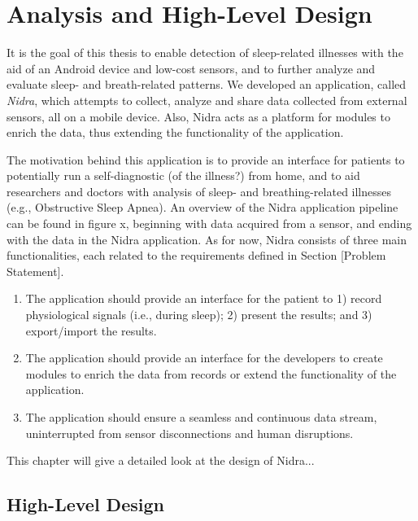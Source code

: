
\chapter{Analysis and High-Level Design}

It is the goal of this thesis to enable detection of sleep-related illnesses 
with the aid of an Android device and low-cost sensors, and to further analyze 
and evaluate sleep- and breath-related patterns. We developed an application, 
called \textit{Nidra}, which attempts to collect, analyze and share data collected 
from external sensors, all on a mobile device. Also, Nidra acts as a platform for 
modules to enrich the data, thus extending the functionality of the application.

The motivation behind this application is to provide an interface for patients 
to potentially run a self-diagnostic (of the illness?) from home, and to aid 
researchers and doctors with analysis of sleep- and breathing-related illnesses 
(e.g., Obstructive Sleep Apnea). An overview of the Nidra application pipeline 
can be found in figure x, beginning with data acquired from a sensor, and ending 
with the data in the Nidra application. As for now, Nidra consists of three 
main functionalities, each related to the requirements defined in Section [Problem Statement]. 

\begin{enumerate}
    \item The application should provide an interface for the patient to 1) record physiological signals (i.e., during sleep); 2) present the results; and 3) export/import the results.
    \item The application should provide an interface for the developers to create modules to enrich the data from records or extend the functionality of the application. 
    \item The application should ensure a seamless and continuous data stream, uninterrupted from sensor disconnections and human disruptions.
\end{enumerate}

This chapter will give a detailed look at the design of Nidra...

\section{High-Level Design}

